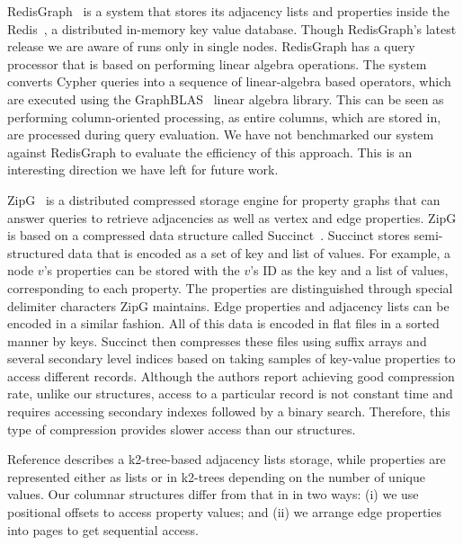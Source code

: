 RedisGraph~\cite{redisgraph} is a system that stores its adjacency lists and properties inside the Redis~\cite{redis}, a distributed in-memory key value database. Though RedisGraph's latest release we are aware of runs only in single nodes. RedisGraph has a query processor that is based on performing linear algebra operations. The system converts Cypher queries into a sequence of linear-algebra based operators, which are executed using the GraphBLAS~\cite{graphblas} linear algebra library. This can be seen as performing column-oriented processing, as entire columns, which are stored in, are processed during query evaluation. We have not benchmarked our system against RedisGraph to evaluate the efficiency of this approach. This is an interesting direction we have left for future work.

ZipG~\cite{zipg} is a distributed compressed storage engine for property graphs that can answer queries to retrieve adjacencies as well as vertex and edge properties. ZipG is based on a compressed data structure called Succinct~\cite{succinct}. Succinct stores semi-structured data that is encoded as a set of key and list of values. For example, a node $v$'s properties can be stored with the $v$'s ID as the key and a list of values, corresponding to each property. The properties are distinguished through special delimiter characters ZipG maintains. Edge properties and adjacency lists can be encoded in a similar fashion. All of this data is encoded in flat files in a sorted manner by keys. Succinct then compresses these files using suffix arrays and several secondary level indices based on taking samples of key-value properties to access different records. Although the authors report achieving good compression rate, unlike our structures, access to a particular record is not constant time and requires accessing secondary indexes followed by a binary search. Therefore, this type of compression provides slower access than our structures. 

Reference \cite{compact-rep-graph} describes a k2-tree-based adjacency lists storage, while properties are represented either as lists or in k2-trees depending on the number of unique values. Our columnar structures differ from that in \cite{compact-rep-graph} in two ways: (i) we use positional offsets to access property values; and (ii) we arrange edge properties into pages to get sequential access.

